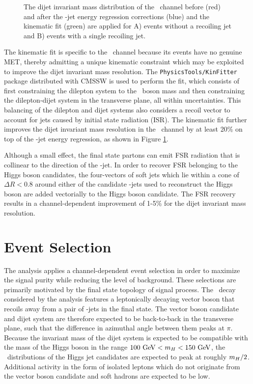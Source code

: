 \begin{figure}[htbp]
{  }
  \caption[Performance of \ZllH\ Kinematic Fit]{The dijet invariant mass distribution of the \ZllH\ channel before (red) and after the \qrkb-jet energy regression corrections (blue) and the kinematic fit (green) are applied for A) events without a recoiling jet and B) events with a single recoiling jet.}
    \label{fig:kinfit_perf}
\end{figure}

The kinematic fit is specific to the \ZllH\ channel because its events have no genuine MET, thereby admitting a unique kinematic constraint which may be exploited to improve the dijet invariant mass resolution. The \texttt{PhysicsTools/KinFitter} package distributed with CMSSW is used to perform the fit, which consists of first constraining the dilepton system to the \bosZ\ boson mass and then constraining the dilepton-dijet system in the transverse plane, all within uncertainties. This balancing of the dilepton and dijet systems also considers a recoil vector to account for jets caused by initial state radiation (ISR). The kinematic fit further improves the dijet invariant mass resolution in the \ZllH\ channel by at least 20\% on top of the \qrkb-jet energy regression, as shown in Figure \ref{fig:kinfit_perf}.

Although a small effect, the final state partons can emit FSR radiation that is collinear to the direction of the \qrkb-jet. In order to recover FSR belonging to the Higgs boson candidates, the four-vectors of soft jets which lie within a cone of $\Delta R <0.8$ around either of the candidate \qrkb-jets used to reconstruct the Higgs boson are added vectorially to the Higgs boson candidate. The FSR recovery results in a channel-dependent improvement of 1-5\% for the dijet invariant mass resolution.

\section{Event Selection}

The analysis applies a channel-dependent event selection in order to maximize the signal purity while reducing the level of background. These selections are primarily motivated by the final state topology of signal process. The \VHbb\ decay considered by the analysis features a leptonically decaying vector boson that recoils away from a pair of \qrkb-jets in the final state. The vector boson candidate and dijet system are therefore expected to be back-to-back in the transverse plane, such that the difference in azimuthal angle between them peaks at $\pi$. Because the invariant mass of the dijet system is expected to be compatible with the mass of the Higgs boson in the range $100\ \mathrm{GeV} < m_{H} < 150\ \mathrm{GeV}$, the \pT\ distributions of the Higgs jet candidates are expected to peak at roughly $m_{H}/2$. Additional activity in the form of isolated leptons which do not originate from the vector boson candidate and soft hadrons are expected to be low.

